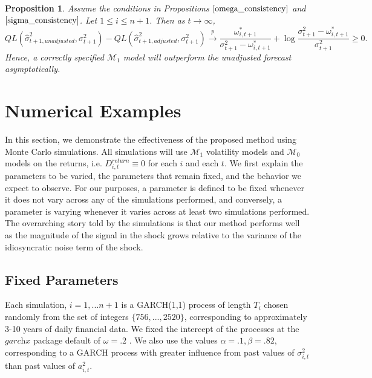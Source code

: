 \documentclass[11pt,3p,review,authoryear]{elsarticle}
\def\mc#1{\mathcal{#1}} %
\def\mc#1{\mathcal{#1}}
\newtheorem{prop}{Proposition}
\theoremstyle{definition}
\begin{document}
\begin{prop}\label{asymptotic_consistency}
Assume the conditions in Propositions $\ref{omega_consistency}$ and $\ref{sigma_consistency}$.  Let $1\leq i\leq n+1$.  Then as $t\rightarrow \infty$,
$$QL(\hat\sigma_{t+1, unadjusted}^{2},\sigma^{2}_{t+1})-QL(\hat\sigma^{2}_{t+1, adjusted},\sigma^{2}_{t+1}) \overset{p}{\longrightarrow} \frac{\omega_{i,t+1}^{*}}{\sigma^{2}_{t+1}-\omega_{i,t+1}^{*}} + \log{\frac{\sigma_{t+1}^{2}-\omega_{i,t+1}^{*}}{\sigma_{t+1}^{2}} } \geq 0.$$
Hence, a correctly specified $\mc{M}_1$ model will outperform the unadjusted forecast asymptotically.
\end{prop}

\section{Numerical Examples}

In this section, we demonstrate the effectiveness of the proposed method using Monte Carlo simulations.  All simulations will use $\mc{M}_1$ volatility models and $\mc{M}_0$ models on the returns, i.e. $  D^{return}_{i,t} \equiv 0$ for each $i$ and each $t$.  We first explain the parameters to be varied, the parameters that remain fixed, and the behavior we expect to observe.  For our purposes, a parameter is defined to be fixed whenever it does not vary across any of the simulations performed, and conversely, a parameter is varying whenever it varies across at least two simulations performed. The overarching story told by the simulations is that our method performs well as the magnitude of the signal in the shock grows relative to the variance of the idiosyncratic noise term of the shock. 

  \subsection{Fixed Parameters}
Each simulation, $i=1,...n+1$ is a GARCH(1,1) process of length $T_{i}$ chosen randomly from the set of integers $\{756,...,2520\}$, corresponding to approximately 3-10 years of daily financial data.  We fixed the intercept of the processes at the $\textit{garchx}$ package default of $\omega = .2$ \citep{RePEc:pra:mprapa:100301}.  We also use the values $\alpha=.1, \beta = .82$, corresponding to a GARCH process with greater influence from past values of $\sigma^{2}_{i,t}$ than past values of $a^{2}_{i,t}$.
\end{document}
